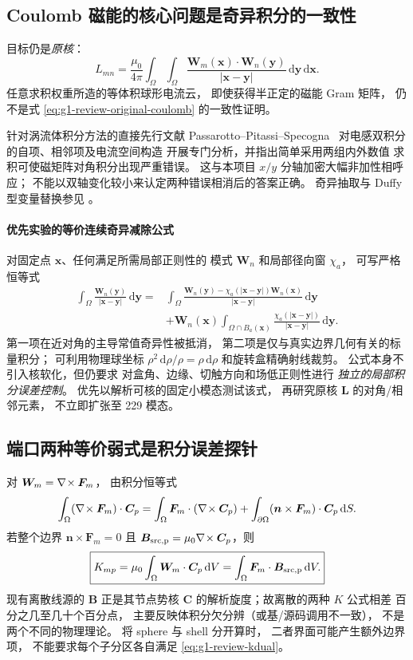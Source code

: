 \subsection{Coulomb 磁能的核心问题是奇异积分的一致性}
目标仍是\emph{原核}：
\begin{equation}
L_{mn}=\frac{\mu_0}{4\pi}
\int_\Omega\int_\Omega
\frac{\bm W_m(\bm x)\cdot\bm W_n(\bm y)}
{|\bm x-\bm y|}\,\mathrm d\bm y\,\mathrm d\bm x.
\label{eq:g1-review-original-coulomb}
\end{equation}
任意求积权重所造的等体积球形电流云，
即使获得半正定的磁能 Gram 矩阵，
仍不是式 \eqref{eq:g1-review-original-coulomb}
的一致性证明。

针对涡流体积分方法的直接先行文献
Passarotto--Pitassi--Specogna~\cite{passarotto2022}
对电感双积分的自项、相邻项及电流空间构造
开展专门分析，并指出简单采用两组内外数值
求积可使磁矩阵对角积分出现严重错误。
这与本项目 $x/y$ 分轴加密大幅非加性相呼应；
不能以双轴变化较小来认定两种错误相消后的答案正确。
奇异抽取与 Duffy 型变量替换参见
\cite{jarvenpaa2003,duffy1982}。

\paragraph{优先实验的等价连续奇异减除公式}
对固定点 $\bm x$、任何满足所需局部正则性的
模式 $\bm W_n$ 和局部径向窗 $\chi_a$，
可写严格恒等式
\begin{align}
\int_\Omega\frac{\bm W_n(\bm y)}{|\bm x-\bm y|}
\,\mathrm d\bm y
={}&\int_\Omega
\frac{\bm W_n(\bm y)-\chi_a(|\bm x-\bm y|)\bm W_n(\bm x)}
{|\bm x-\bm y|}\,\mathrm d\bm y\nonumber\\
&+\bm W_n(\bm x)
\int_{\Omega\cap B_a(\bm x)}
\frac{\chi_a(|\bm x-\bm y|)}{|\bm x-\bm y|}
\,\mathrm d\bm y.
\label{eq:g1-review-subtraction}
\end{align}
第一项在近对角的主导常值奇异性被抵消，
第二项是仅与真实边界几何有关的标量积分；
可利用物理球坐标 $\rho^2\,\mathrm d\rho/
\rho=\rho\,\mathrm d\rho$ 和旋转盒精确射线裁剪。
公式本身不引入核软化，但仍要求
对盒角、边缘、切触方向和场低正则性进行
\emph{独立的局部积分误差控制}。
优先以解析可核的固定小模态测试该式，
再研究原核 $\bm L$ 的对角/相邻元素，
不立即扩张至 229 模态。

\subsection{端口两种等价弱式是积分误差探针}
对 $\bm W_m=\nabla\!\times\bm F_m$，
由积分恒等式
\[
\int_\Omega(\nabla\!\times\bm F_m)\cdot\bm C_p
=\int_\Omega\bm F_m\cdot(\nabla\!\times\bm C_p)
+\int_{\partial\Omega}(\bm n\times\bm F_m)
\cdot\bm C_p\,\mathrm dS.
\]
若整个边界 $\bm n\times\bm F_m=0$ 且
$\bm B_{\rm src,p}=\mu_0\nabla\!\times\bm C_p$，则
\begin{equation}
\boxed{K_{mp}
=\mu_0\int_\Omega \bm W_m\cdot\bm C_p\,\mathrm dV
=\int_\Omega\bm F_m\cdot\bm B_{\rm src,p}\,\mathrm dV.}
\label{eq:g1-review-kdual}
\end{equation}
现有离散线源的 $\bm B$ 正是其节点势核 $\bm C$
的解析旋度；故离散的两种 $K$ 公式相差
百分之几至几十个百分点，
主要反映体积分欠分辨（或基/源码调用不一致），
不是两个不同的物理理论。
将 sphere 与 shell 分开算时，
二者界面可能产生额外边界项，
不能要求每个子分区各自满足 \eqref{eq:g1-review-kdual}。

